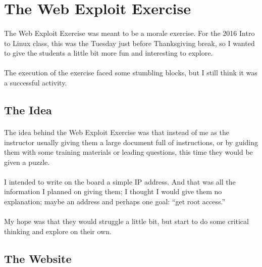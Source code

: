 \documentclass[11pt]{article}
\begin{document}
	\hrulefill

	\newpage

	\section{The Web Exploit Exercise}

	\paragraph{} The Web Exploit Exercise was meant to be a morale exercise. For the 2016 Intro to Linux class, this was the Tuesday just before Thanksgiving break, so I wanted to give the students a little bit more fun and interesting to explore. 

	\paragraph{} The execution of the exercise faced some stumbling blocks, but I still think it was a successful activity.

	\subsection{The Idea}

	\paragraph{} The idea behind the Web Exploit Exercise was that instead of me as the instructor usually giving them a large document full of instructions, or by guiding them with some training materials or leading questions, this time they would be given a puzzle.

	\paragraph{} I intended to write on the board a simple IP address. And that was all the information I planned on giving them; I thought I would give them no explanation; maybe an address and perhaps one goal: ``get root access.''

	\paragraph{} My hope was that they would struggle a little bit, but start to do some critical thinking and explore on their own.

	\subsection{The Website}
\end{document}
